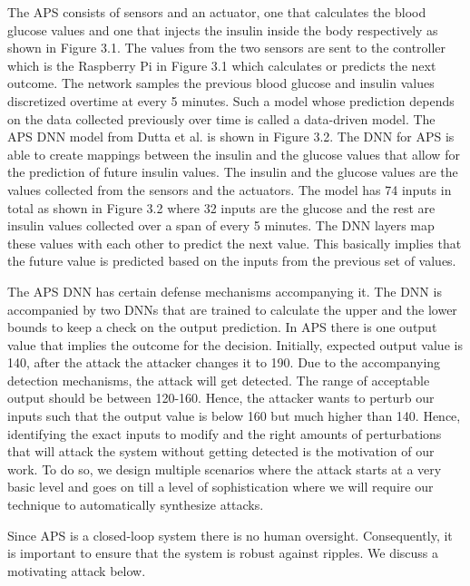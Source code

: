 The APS consists of sensors and an actuator, one that calculates the blood glucose values and one that injects the insulin inside the body respectively as shown in Figure 3.1. The values from the two sensors are sent to the controller which is the Raspberry Pi in Figure 3.1 which calculates or predicts the next outcome. The network samples the previous blood glucose and insulin values discretized overtime at every 5 minutes. Such a model whose prediction depends on the data collected previously over time is called a data-driven model. The APS DNN model from Dutta et al. is shown in Figure 3.2. The DNN for APS is able to create mappings between the insulin and the glucose values that allow for the prediction of future insulin values. The insulin and the glucose values are the values collected from the sensors and the actuators. The model has 74 inputs in total as shown in Figure 3.2 where 32 inputs are the glucose and the rest are insulin values collected over a span of every 5 minutes. The DNN layers map these values with each other to predict the next value. This basically implies that the future value is predicted based on the inputs from the previous set of values. 


The APS DNN has certain defense mechanisms accompanying it. The DNN is accompanied by two DNNs that are trained to calculate the upper and the lower bounds to keep a check on the output prediction. In APS there is one output value that implies the outcome for the decision. Initially, expected output value is 140, after the attack the attacker changes it to 190. Due to the accompanying detection mechanisms, the attack will get detected. The range of acceptable output should be between 120-160. Hence, the attacker wants to perturb our inputs such that the output value is below 160 but much higher than 140. Hence, identifying the exact inputs to modify and the right amounts of perturbations that will attack the system without getting detected is the motivation of our work. To do so, we design multiple scenarios where the attack starts at a very basic level and goes on till a level of sophistication where we will require our technique to automatically synthesize attacks. 

Since APS is a closed-loop system there is no human oversight. Consequently, it is important to ensure that the system is robust against ripples. We discuss a motivating attack below. 



